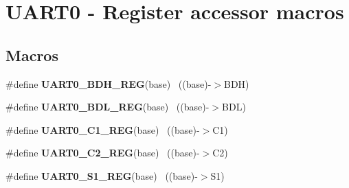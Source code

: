 \hypertarget{group___u_a_r_t0___register___accessor___macros}{}\section{U\+A\+R\+T0 -\/ Register accessor macros}
\label{group___u_a_r_t0___register___accessor___macros}
\subsection*{Macros}
\begin{DoxyCompactItemize}
\item 
\hypertarget{group___u_a_r_t0___register___accessor___macros_ga1786ecc749d15c69e1f6b3ebb5b07976}{}\#define {\bfseries U\+A\+R\+T0\+\_\+\+B\+D\+H\+\_\+\+R\+E\+G}(base)                                        ~((base)-\/$>$B\+D\+H)\label{group___u_a_r_t0___register___accessor___macros_ga1786ecc749d15c69e1f6b3ebb5b07976}

\item 
\hypertarget{group___u_a_r_t0___register___accessor___macros_ga9117ec6b275fdf09acabb04ce0d0d6a0}{}\#define {\bfseries U\+A\+R\+T0\+\_\+\+B\+D\+L\+\_\+\+R\+E\+G}(base)                                        ~((base)-\/$>$B\+D\+L)\label{group___u_a_r_t0___register___accessor___macros_ga9117ec6b275fdf09acabb04ce0d0d6a0}

\item 
\hypertarget{group___u_a_r_t0___register___accessor___macros_ga923e607588dfd8dd218e437afaa00c71}{}\#define {\bfseries U\+A\+R\+T0\+\_\+\+C1\+\_\+\+R\+E\+G}(base)                                          ~((base)-\/$>$C1)\label{group___u_a_r_t0___register___accessor___macros_ga923e607588dfd8dd218e437afaa00c71}

\item 
\hypertarget{group___u_a_r_t0___register___accessor___macros_gafb7e1fb088da5fb6b39ef150333580c7}{}\#define {\bfseries U\+A\+R\+T0\+\_\+\+C2\+\_\+\+R\+E\+G}(base)                                          ~((base)-\/$>$C2)\label{group___u_a_r_t0___register___accessor___macros_gafb7e1fb088da5fb6b39ef150333580c7}

\item 
\hypertarget{group___u_a_r_t0___register___accessor___macros_ga9eadfd0c0a45ee8aa7ac442645b631e5}{}\#define {\bfseries U\+A\+R\+T0\+\_\+\+S1\+\_\+\+R\+E\+G}(base)                                          ~((base)-\/$>$S1)\label{group___u_a_r_t0___register___accessor___macros_ga9eadfd0c0a45ee8aa7ac442645b631e5}


\end{DoxyCompactItemize}
